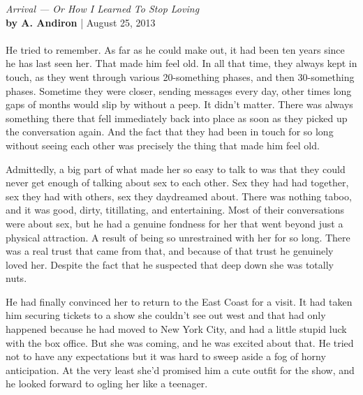 \documentclass[letterpaper]{article}
\begin{document}
   \noindent
   \Large{\emph{Arrival --- Or How I Learned To Stop Loving}} \\%
   \normalsize %
   \textbf{by A. Andiron} | August 25, 2013
   \vspace{1mm} %
   \hrulefill \\ %
\\
He tried to remember. As far as he could make out, it had been ten years since he has last seen her.
That made him feel old. In all that time, they always kept in touch, as they went through various 20-something phases, and then 30-something phases.
Sometime they were closer, sending messages every day, other times long gaps of months would slip by without a peep.
It didn't matter. There was always something there that fell immediately back into place as soon as they picked up the conversation again.
And the fact that they had been in touch for so long without seeing each other was precisely the thing that made him feel old.

Admittedly, a big part of what made her so easy to talk to was that they could never get enough of talking about sex to each other.
Sex they had had together, sex they had with others, sex they daydreamed about. There was nothing taboo, and it was good, dirty, titillating, and entertaining.
Most of their conversations were about sex, but he had a genuine fondness for her that went beyond just a physical attraction. A result of being so unrestrained with her for so long.
There was a real trust that came from that, and because of that trust he genuinely loved her. Despite the fact that he suspected that deep down she was totally nuts.

He had finally convinced her to return to the East Coast for a visit. It had taken him securing tickets to a show she couldn't see out west and that had only happened because he had moved to New York City, and had a little stupid luck with the box office.
But she was coming, and he was excited about that. He tried not to have any expectations but it was hard to sweep aside a fog of horny anticipation. At the very least she'd promised him a cute outfit for the show, and he looked forward to ogling her like a teenager.
\end{document}
